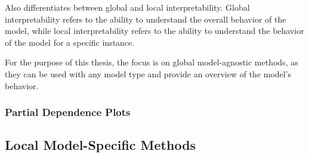 Also \cite{molnar2020interpretable} differentiates between global and local interpretability. Global
interpretability refers to the ability to understand the overall behavior of the model, while
local interpretability refers to the ability to understand the behavior of the model for a
specific instance.

For the purpose of this thesis, the focus is on global model-agnostic methods, as they can be used
with any model type and provide an overview of the model's behavior.

\subsubsection*{Partial Dependence Plots}

\subsection{Local Model-Specific Methods}\label{subsec:local-model-specific-methods}








